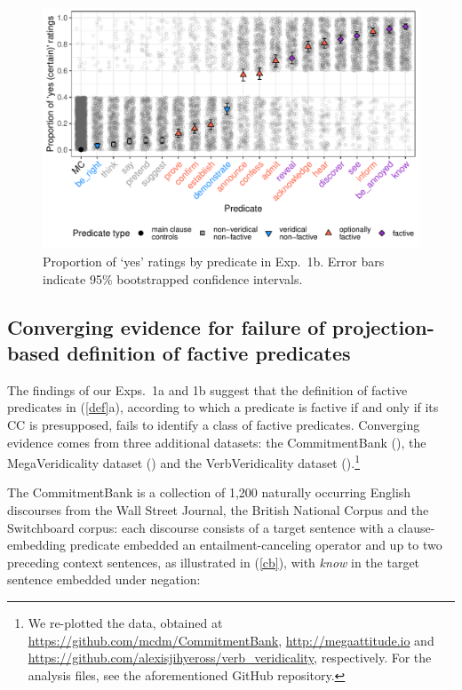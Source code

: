\documentclass[11pt,fleqn]{article}
\newcommand{\6}{\mbox{$[\hspace*{-.6mm}[$}}
\newcommand{\9}{\mbox{$]\hspace*{-.6mm}]$}}
\begin{document}
\begin{figure}[H]

\centering
\includegraphics[width=.7\paperwidth]{../../results/8-projectivity-no-fact-binary/graphs/proportion-by-predicate-variability}
\caption{Proportion of `yes' ratings by predicate in Exp.~1b. Error bars indicate 95\% bootstrapped confidence intervals.}
\label{f-projectivity2}

\end{figure}


\subsection{Converging evidence for failure of projection-based definition of factive predicates}

The findings of our Exps.~1a and 1b suggest that the definition of factive predicates in (\ref{def}a), according to which a predicate is factive if and only if its CC is presupposed, fails to identify a class of factive predicates. Converging evidence comes from three additional datasets: the CommitmentBank (\citealt*{demarneffe-etal-sub23}), the MegaVeridicality dataset (\citealt{white-rawlins-nels2018,white-etal2018b}) and the VerbVeridicality dataset (\citealt{ross-pavlick2019}).\footnote{We re-plotted the data, obtained at \url{https://github.com/mcdm/CommitmentBank}, \url{http://megaattitude.io} and \url{https://github.com/alexisjihyeross/verb_veridicality}, respectively. For the analysis files, see the aforementioned GitHub repository.}

The CommitmentBank is a collection of 1,200 naturally occurring English discourses from the Wall Street Journal, the British National Corpus and the Switchboard corpus: each discourse consists of a target sentence with a clause-embedding predicate embedded an entailment-canceling operator and up to two preceding context sentences, as illustrated in (\ref{cb}), with {\em know} in the target sentence embedded under negation:
\end{document}

